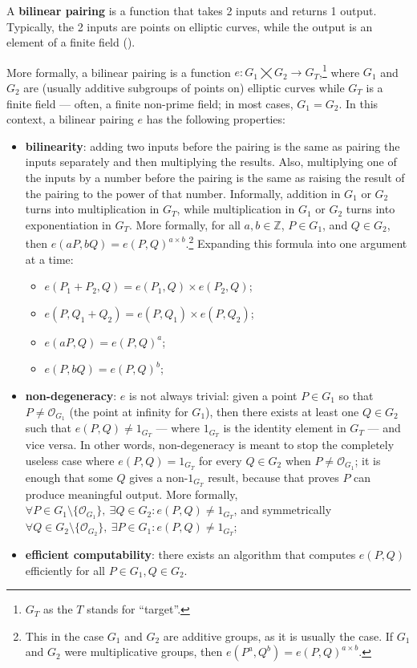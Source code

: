 A \textbf{bilinear pairing} is a function that takes 2 inputs and returns 1 output. Typically, the 2 inputs are points on elliptic curves, while the output is an element of a finite field ().

More formally, a bilinear pairing is a function $e: G_1 \bigtimes G_2 \rightarrow G_T$,\footnote{$G_T$ as the $T$ stands for ``target''.} where $G_1$ and $G_2$ are (usually additive subgroups of points on) elliptic curves while $G_T$ is a finite field --- often, a finite non-prime field; in most cases, $G_1 = G_2$. In this context, a bilinear pairing $e$ has the following properties:
\begin{itemize}
	\item \textbf{bilinearity}: adding two inputs before the pairing is the same as pairing the inputs separately and then multiplying the results. Also, multiplying one of the inputs by a number before the pairing is the same as raising the result of the pairing to the power of that number. Informally, addition in $G_1$ or $G_2$ turns into multiplication in $G_T$, while multiplication in $G_1$ or $G_2$ turns into exponentiation in $G_T$. More formally, for all $a, b \in \mathbb{Z}$, $P \in G_1$, and $Q \in G_2$, then $e(aP, bQ) = e(P, Q)^{a \times b}$.\footnote{This in the case $G_1$ and $G_2$ are additive groups, as it is usually the case. If $G_1$ and $G_2$ were multiplicative groups, then $e(P^a, Q^b) = e(P, Q)^{a \times b}$.} Expanding this formula into one argument at a time:
	\begin{itemize}
		\item $e(P_1 + P_2, Q) = e(P_1, Q) \times e(P_2, Q)$;
		\item $e(P, Q_1 + Q_2) = e(P, Q_1) \times e(P, Q_2)$;
		\item $e(aP, Q) = e(P, Q)^a$;
		\item $e(P, bQ) = e(P, Q)^b$;
	\end{itemize}
	
	\item \textbf{non-degeneracy}: $e$ is not always trivial: given a point $P \in G_1$ so that $P \neq \mathcal{O}_{G_1}$ (the point at infinity for $G_1$), then there exists at least one $Q \in G_2$ such that $e(P, Q) \neq 1_{G_T}$ --- where $1_{G_T}$ is the identity element in $G_T$ --- and vice versa. In other words, non-degeneracy is meant to stop the completely useless case where $e(P, Q) = 1_{G_T}$ for every $Q \in G_2$ when $P \neq \mathcal{O}_{G_1}$; it is enough that some $Q$ gives a non-$1_{G_T}$ result, because that proves $P$ can produce meaningful output. More formally, $\forall P \in G_1 \setminus \{\mathcal{O}_{G_1}\}, \ \exists Q \in G_2 : e(P, Q) \neq 1_{G_T}$, and symmetrically $\forall Q \in G_2 \setminus \{\mathcal{O}_{G_2}\}, \ \exists P \in G_1 : e(P, Q) \neq 1_{G_T}$;
	
	\item \textbf{efficient computability}: there exists an algorithm that computes $e(P, Q)$ efficiently for all $P \in G_1, Q \in G_2$.
\end{itemize}

